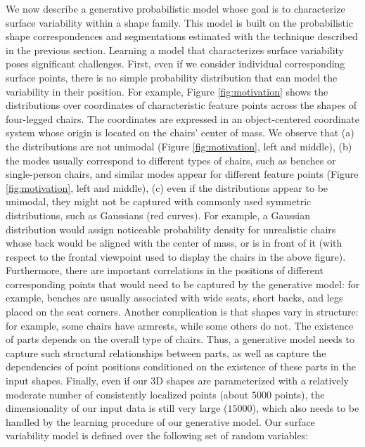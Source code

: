 We now describe a generative probabilistic model whose goal is to characterize surface variability within a shape family. This model is built on the probabilistic shape correspondences and segmentations estimated with the technique described in the previous section. Learning a model that characterizes surface variability poses significant challenges. First, even if we consider individual corresponding surface points, there is no simple probability distribution that can model the variability in their position. For example, Figure \ref{fig:motivation} shows the distributions over coordinates of characteristic feature points across the shapes of four-legged chairs. The coordinates are expressed in an object-centered coordinate system whose origin is located on the chairs' center of mass. We observe that (a) the distributions are not unimodal (Figure \ref{fig:motivation}, left and middle), (b) the modes usually correspond to different types of chairs, such as benches or single-person chairs, and similar modes appear for different feature points (Figure \ref{fig:motivation}, left and middle), (c) even if the distributions appear to be unimodal, they might not be captured with commonly used symmetric distributions, such as Gaussians (red curves). For example, a Gaussian distribution would assign noticeable probability density for unrealistic chairs whose back would be aligned with the center of mass, or is in front of it (with respect to the frontal viewpoint used to display the chairs in the above figure). Furthermore, there are important correlations in the positions of different corresponding points that would need to be captured by the generative model: for example, benches are usually associated with wide seats, short backs, and legs placed on the seat corners. Another complication is that shapes vary in structure: for example, some chairs have armrests, while some others do not. The existence of parts depends on the overall type of chairs. Thus, a generative model needs to capture such structural relationships between parts, as well as capture the dependencies of point positions conditioned on the existence of these parts in the input shapes. Finally, even if our 3D shapes are parameterized with a relatively moderate number of consistently localized points (about $5000$ points), the dimensionality of our input data is still very large ($15000$), which also needs to be handled by the learning procedure of our generative model.  Our surface variability model is defined over the following set of random variables:
